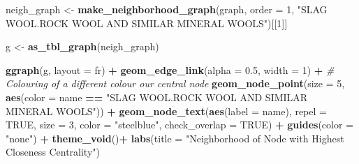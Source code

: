 \documentclass[
]{article}
\newenvironment{Shaded}{\begin{snugshade}}{\end{snugshade}}
\newcommand{\AttributeTok}[1]{\textcolor[rgb]{0.13,0.29,0.53}{#1}}
\newcommand{\CommentTok}[1]{\textcolor[rgb]{0.56,0.35,0.01}{\textit{#1}}}
\newcommand{\ConstantTok}[1]{\textcolor[rgb]{0.56,0.35,0.01}{#1}}
\newcommand{\DecValTok}[1]{\textcolor[rgb]{0.00,0.00,0.81}{#1}}
\newcommand{\FloatTok}[1]{\textcolor[rgb]{0.00,0.00,0.81}{#1}}
\newcommand{\FunctionTok}[1]{\textcolor[rgb]{0.13,0.29,0.53}{\textbf{#1}}}
\newcommand{\NormalTok}[1]{#1}
\newcommand{\OtherTok}[1]{\textcolor[rgb]{0.56,0.35,0.01}{#1}}
\newcommand{\SpecialCharTok}[1]{\textcolor[rgb]{0.81,0.36,0.00}{\textbf{#1}}}
\newcommand{\StringTok}[1]{\textcolor[rgb]{0.31,0.60,0.02}{#1}}
\begin{document}
\begin{Shaded}
\begin{Highlighting}[]
\NormalTok{neigh\_graph }\OtherTok{\textless{}{-}} \FunctionTok{make\_neighborhood\_graph}\NormalTok{(graph,}
                                       \AttributeTok{order =} \DecValTok{1}\NormalTok{, }
                                       \StringTok{"SLAG WOOL.ROCK WOOL AND SIMILAR MINERAL WOOLS"}\NormalTok{)[[}\DecValTok{1}\NormalTok{]]}

\NormalTok{g }\OtherTok{\textless{}{-}} \FunctionTok{as\_tbl\_graph}\NormalTok{(neigh\_graph)}

\FunctionTok{ggraph}\NormalTok{(g, }\AttributeTok{layout =} \StringTok{\textquotesingle{}fr\textquotesingle{}}\NormalTok{) }\SpecialCharTok{+}
  \FunctionTok{geom\_edge\_link}\NormalTok{(}\AttributeTok{alpha =} \FloatTok{0.5}\NormalTok{, }\AttributeTok{width =} \DecValTok{1}\NormalTok{) }\SpecialCharTok{+}
  \CommentTok{\# Colouring of a different colour our central node}
  \FunctionTok{geom\_node\_point}\NormalTok{(}\AttributeTok{size =} \DecValTok{5}\NormalTok{, }
                  \FunctionTok{aes}\NormalTok{(}\AttributeTok{color =}\NormalTok{ name }\SpecialCharTok{==} \StringTok{"SLAG WOOL.ROCK WOOL AND SIMILAR MINERAL WOOLS"}\NormalTok{)) }\SpecialCharTok{+}
  \FunctionTok{geom\_node\_text}\NormalTok{(}\FunctionTok{aes}\NormalTok{(}\AttributeTok{label =}\NormalTok{ name), }
                 \AttributeTok{repel =} \ConstantTok{TRUE}\NormalTok{, }
                 \AttributeTok{size =} \DecValTok{3}\NormalTok{, }
                 \AttributeTok{color =} \StringTok{"steelblue"}\NormalTok{, }
                 \AttributeTok{check\_overlap =} \ConstantTok{TRUE}\NormalTok{) }\SpecialCharTok{+}
  \FunctionTok{guides}\NormalTok{(}\AttributeTok{color =} \StringTok{"none"}\NormalTok{) }\SpecialCharTok{+}    
  \FunctionTok{theme\_void}\NormalTok{()}\SpecialCharTok{+}
  \FunctionTok{labs}\NormalTok{(}\AttributeTok{title =} \StringTok{"Neighborhood of Node with Highest Closeness Centrality"}\NormalTok{)}
\end{Highlighting}
\end{Shaded}
\end{document}
